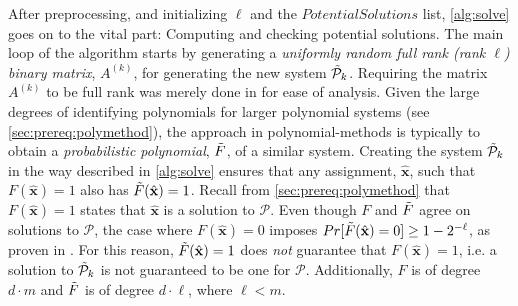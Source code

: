 After preprocessing, and initializing $\ell$ and the $PotentialSolutions$ list, \cref{alg:solve} goes on to the vital part: Computing and checking potential solutions. The main loop of the algorithm starts by generating a \textit{uniformly random full rank (rank $\ell$) binary matrix}, $A^{(k)}$, for generating the new system $\Tilde{\mathcal{P}}_k$. Requiring the matrix $A^{(k)}$ to be full rank was merely done in \cite{eurocrypt-2021-30841} for ease of analysis. Given the large degrees of identifying polynomials for larger polynomial systems (see \cref{sec:prereq:polymethod}), the approach in polynomial-methods is typically to obtain a \textit{probabilistic polynomial}, $\Tilde{F}$, of a similar system. Creating the system $\Tilde{\mathcal{P}}_k$ in the way described in \cref{alg:solve} ensures that any assignment, $\hat{\mathbf{x}}$, such that $F(\hat{\mathbf{x}}) = 1$ also has $\Tilde{F}(\hat{\mathbf{x}}) = 1$. Recall from \cref{sec:prereq:polymethod} that $F(\hat{\mathbf{x}}) = 1$ states that $\hat{\mathbf{x}}$ is a solution to $\mathcal{P}$. Even though $F$ and $\Tilde{F}$ agree on solutions to $\mathcal{P}$, the case where $F(\hat{\mathbf{x}}) = 0$ imposes $Pr[\Tilde{F}(\hat{\mathbf{x}}) = 0] \geq 1 - 2^{-\ell}$, as proven in \cite{eurocrypt-2021-30841}. For this reason, $\Tilde{F}(\hat{\mathbf{x}}) = 1$ does \textit{not} guarantee that $F(\hat{\mathbf{x}}) = 1$, i.e. a solution to $\Tilde{\mathcal{P}}_k$ is not guaranteed to be one for $\mathcal{P}$. Additionally, $F$ is of degree $d \cdot m$ and $\Tilde{F}$ is of degree $d \cdot \ell$, where $\ell < m$.

